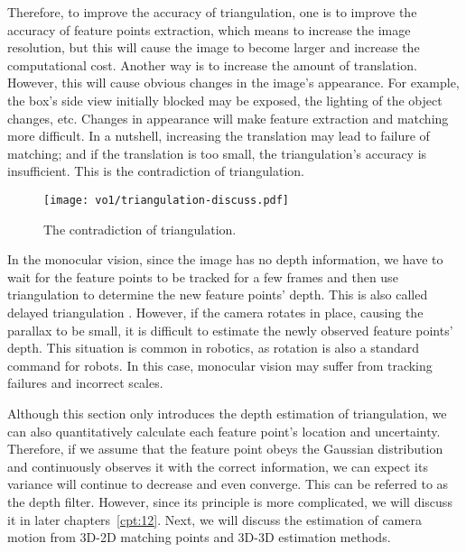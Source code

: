 Therefore, to improve the accuracy of triangulation, one is to improve the accuracy of feature points extraction, which means to increase the image resolution, but this will cause the image to become larger and increase the computational cost. Another way is to increase the amount of translation. However, this will cause obvious changes in the image's appearance. For example, the box's side view initially blocked may be exposed, the lighting of the object changes, etc. Changes in appearance will make feature extraction and matching more difficult. In a nutshell, increasing the translation may lead to failure of matching; and if the translation is too small, the triangulation's accuracy is insufficient. This is the contradiction of triangulation. 

\begin{figure}[!ht]
	\centering
	\texttt{[image: vo1/triangulation-discuss.pdf]}
	\caption{The contradiction of triangulation.}
	\label{fig:triangulation-discuss}
\end{figure}

In the monocular vision, since the image has no depth information, we have to wait for the feature points to be tracked for a few frames and then use triangulation to determine the new feature points' depth. This is also called delayed triangulation  {\cite{Davison2003}}. However, if the camera rotates in place, causing the parallax to be small, it is difficult to estimate the newly observed feature points' depth. This situation is common in robotics, as rotation is also a standard command for robots. In this case, monocular vision may suffer from tracking failures and incorrect scales.

Although this section only introduces the depth estimation of triangulation, we can also quantitatively calculate each feature point's location and uncertainty. Therefore, if we assume that the feature point obeys the Gaussian distribution and continuously observes it with the correct information, we can expect its variance will continue to decrease and even converge. This can be referred to as the depth filter. However, since its principle is more complicated, we will discuss it in later chapters~\ref{cpt:12}. Next, we will discuss the estimation of camera motion from 3D-2D matching points and 3D-3D estimation methods.

